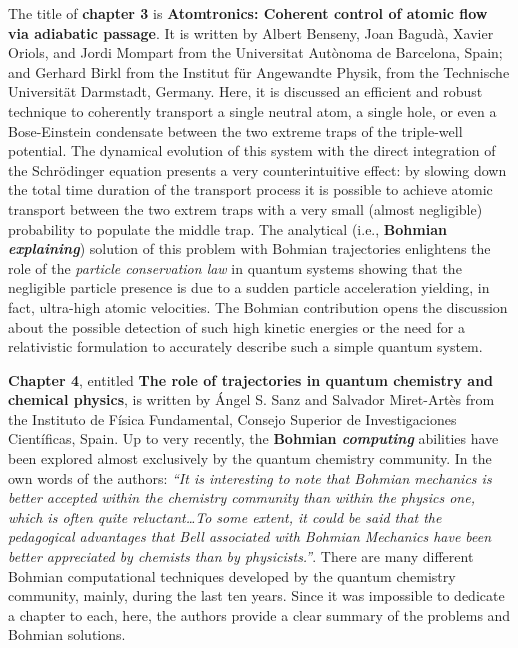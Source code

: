 \documentclass[onecolumn,nofootinbib, secnumarabic, amsmath, nobibnotes,11pt,aps,pra]{revtex4-1}
\begin{document}
The title of \textbf{chapter 3} is \textbf{Atomtronics: Coherent control of atomic flow via adiabatic passage}. It is written by Albert Benseny, Joan Bagud\`{a}, Xavier Oriols, and Jordi Mompart from the Universitat Aut\`{o}noma de Barcelona, Spain; and Gerhard Birkl from the Institut f\"ur Angewandte Physik, from the Technische Universit\"at Darmstadt, Germany. Here, it is discussed an efficient and robust technique to coherently transport a single neutral atom, a single hole, or even a Bose-Einstein condensate between the two extreme traps of the triple-well potential. The dynamical evolution of this system with the direct integration of the Schr\"odinger equation presents a very counterintuitive effect: by slowing down the total time duration of the transport process it is possible to achieve atomic transport between the two extrem traps with a very small (almost negligible) probability to populate the middle trap. The analytical (i.e., \textbf{Bohmian \emph{explaining}}) solution of this problem with Bohmian trajectories enlightens the role of the \emph{particle conservation law} in quantum systems showing that the negligible particle presence is due to a sudden particle acceleration yielding, in fact, ultra-high atomic velocities. The Bohmian contribution opens the discussion about the possible detection of such high kinetic energies or the need for a relativistic formulation to accurately describe such a simple quantum system.

\textbf{Chapter 4}, entitled \textbf{The role of trajectories in quantum chemistry and chemical physics}, is written by \'{A}ngel S. Sanz and Salvador Miret-Art\`es from the Instituto de F\'isica Fundamental, Consejo Superior de Investigaciones Cient\'ificas, Spain. Up to very recently, the \textbf{Bohmian \emph{computing}} abilities have been explored almost exclusively by the quantum chemistry community. In the own words of the authors: \emph{``It is interesting to note that Bohmian mechanics is better accepted within the chemistry community than within the physics one, which is often quite reluctant\ldots To some extent, it could be said that the pedagogical advantages that Bell associated with Bohmian Mechanics have been better appreciated by chemists than by physicists.''}. There are many different Bohmian computational techniques developed by the quantum chemistry community, mainly, during the last ten years. Since it was impossible to dedicate a chapter to each, here, the authors provide a clear summary of the problems and Bohmian solutions.
\end{document}

